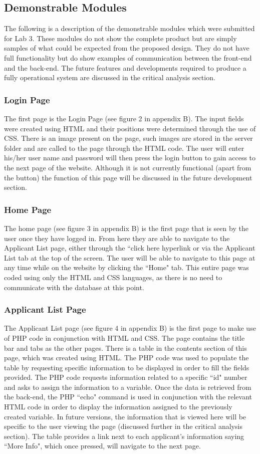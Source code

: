 \documentclass[journal]{IEEEtran}
\begin{document}
\subsection{Demonstrable Modules}
The following is a description of the demonstrable modules which were submitted for Lab 3. These modules do not show the complete product but are simply samples of what could be expected from the proposed design. They do not have full functionality but do show examples of communication between the front-end and the back-end. The future features and developments required to produce a fully operational system are discussed in the critical analysis section.
\hfill \break \subsubsection{Login Page}
The first page is the Login Page (see figure 2 in appendix B). The input fields were created using HTML and their positions were determined through the use of CSS. There is an image present on the page, such images are stored in the server folder and are called to the page through the HTML code. The user will enter his/her user name and password will then press the login button to gain access to the next page of the website. Although it is not currently functional (apart from the button) the function of this page will be discussed in the future development section.
\hfill \break \subsubsection{Home Page}
The home page (see figure 3 in appendix B) is the first page that is seen by the user once they have logged in. From here they are able to navigate to the Applicant List page, either through the “click here hyperlink or via the Applicant List tab at the top of the screen. The user will be able to navigate to this page at any time while on the website by clicking the ``Home" tab. This entire page was coded using only the HTML and CSS languages, as there is no need to communicate with the database at this point.   
\hfill \break \subsubsection{Applicant List Page}
The Applicant List page (see figure 4 in appendix B) is the first page to make use of PHP code in conjunction with HTML and CSS. The page contains the title bar and tabs as the other pages. There is a table in the contents section of this page, which was created using HTML. The PHP code was used to populate the table by requesting specific information to be displayed in order to fill the fields provided. The PHP code requests information related to a specific ``id" number and asks to assign the information to a variable. Once the data is retrieved from the back-end, the PHP ``echo" command is used in conjunction with the relevant HTML code in order to display the information assigned to the previously created variable. In future versions, the information that is viewed here will be specific to the user viewing the page (discussed further in the critical analysis section). The table provides a link next to each applicant's information saying ``More Info", which once pressed, will navigate to the next page.
\end{document}
